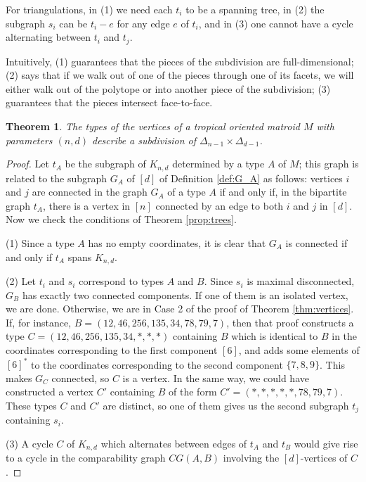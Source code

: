 \documentclass[11pt]{amsart}
\newtheorem{thm}{Theorem}[section]
\begin{document}
For triangulations, in (1) we need each $t_i$ to be a spanning tree, in (2) the subgraph $s_i$ can be $t_i-e$ for any edge $e$ of $t_i$, and in (3) one cannot have a cycle alternating between $t_i$ and $t_j$. 

Intuitively, (1) guarantees that the pieces of the subdivision are full-dimensional; (2) says that if we walk out of one of the pieces through one of its facets, we will either walk out of the polytope or into another piece of the subdivision; (3) guarantees that the pieces intersect face-to-face.


\begin{thm}
The types of the vertices of a tropical oriented matroid $M$ with parameters $(n,d)$ describe a subdivision of $\Delta_{n-1} \times \Delta_{d-1}$.
\end{thm}

\begin{proof}
Let $t_A$ be the subgraph of $K_{n,d}$ determined by a type $A$ of $M$; this graph is related to the subgraph 
$G_A$ of $[d]$ of Definition \ref{def:G_A} as follows: vertices $i$ and $j$ are connected in the graph $G_A$ 
of a type $A$ if and only if, in the bipartite graph $t_A$, there is a vertex in $[n]$ connected by an edge 
to both $i$ and $j$ in $[d]$. Now we check the conditions of Theorem \ref{prop:trees}. 

(1) Since a type $A$ has no empty coordinates, it is clear that $G_A$ is connected if and only if $t_A$ spans $K_{n,d}$.

(2) Let $t_i$ and $s_i$ correspond to types $A$ and $B$. Since $s_i$ is maximal disconnected, $G_B$ has exactly two connected components. If one of them is an isolated vertex, we are done. Otherwise, we are in Case 2 of the proof of Theorem \ref{thm:vertices}. If, for instance, $B=(12,46,256,135,34,78,79,7)$, then that proof constructs a type $C=(12,46,256,135,34,*,*,*)$ containing $B$ which is identical to $B$ in the coordinates corresponding to the first component $[6]$, and adds some elements of $[6]^*$ to the coordinates corresponding to the second component $\{7,8,9\}$. This makes $G_C$ connected, so $C$ is a vertex. In the same way, we could have constructed a vertex $C'$ containing $B$ of the form $C'=(*,*,*,*,*,78,79,7)$. These types $C$ and $C'$ are distinct, so one of them gives us the second subgraph $t_j$ containing $s_i$. 

(3) A cycle $C$ of $K_{n,d}$ which alternates between edges of $t_A$ and $t_B$ would give rise to a cycle in the comparability graph $CG(A,B)$ involving the $[d]$-vertices of $C$.
\end{proof}
\end{document}
